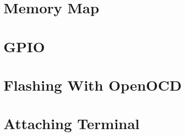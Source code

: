 \documentclass[a4paper,12pt,twoside]{report}
\begin{document}
        \section{Memory Map}
           	

        \section{GPIO}
            

        \section{Flashing With OpenOCD}
            

        \section{Attaching Terminal}
            

    \printbibliography
\end{document}
